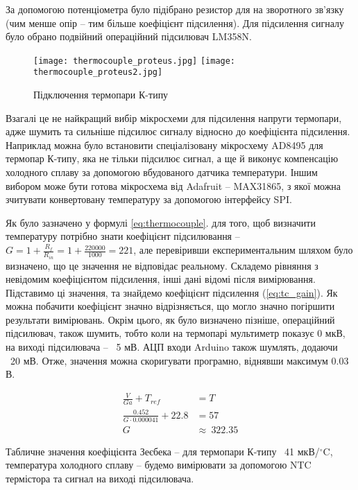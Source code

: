 За допомогою потенціометра було підібрано резистор для на зворотного зв'язку (чим менше опір -- тим більше коефіцієнт підсилення). Для підсилення сигналу було обрано подвійний операційний підсилювач LM358N.

\begin{figure}[ht]
    \centering
    \texttt{[image: thermocouple\_proteus.jpg]}
    \texttt{[image: thermocouple\_proteus2.jpg]}
    \caption{Підключення термопари К-типу}
    \label{fig:thermocouple_proteus}
\end{figure}

Взагалі це не найкращий вибір мікросхеми для підсилення напруги термопари, адже шумить та сильніше підсилює сигналу відносно до коефіцієнта підсилення. Наприклад можна було встановити спеціалізовану мікросхему AD8495 для термопар К-типу, яка не тільки підсилює сигнал, а ще й виконує компенсацію холодного сплаву за допомогою вбудованого датчика температури. Іншим вибором може бути готова мікросхема від Adafruit -- MAX31865, з якої можна зчитувати конвертовану температуру за допомогою інтерфейсу SPI.

Як було зазначено у формулі \ref{eq:thermocouple}. для того, щоб визначити температуру потрібно знати коефіцієнт підсилювання -- $G = 1+\frac{R_f}{R_{in}} = 1+\frac{220000}{1000} = 221$, але перевіривши експериментальним шляхом було визначено, що це значення не відповідає реальному. Складемо рівняння з невідомим коефіцієнтом підсилення, інші дані відомі після вимірювання. Підставимо ці значення, та знайдемо коефіцієнт підсилення (\ref{eq:tc_gain}). Як можна побачити коефіцієнт значно відрізняється, що могло значно погіршити результати вимірювань. Окрім цього, як було визначено пізніше, операційний підсилювач, також шумить, тобто коли на термопарі мультиметр показує 0 мкВ, на виході підсилювача -- ~5 мВ. АЦП входи Arduino також шумлять, додаючи ~20 мВ. Отже, значення можна скоригувати програмно, віднявши максимум 0.03 В.

\begin{equation}
    \begin{aligned}
        \frac{V}{Ga} + T_{ref} &= T \\
        \frac{0.452}{G\cdot0.000041} + 22.8 &= 57 \\
        G~&\approx~322.35
    \end{aligned}
    \label{eq:tc_gain}
\end{equation}

Табличне значення коефіцієнта Зеєбека -- для термопари К-типу ~41 мкВ/$^\circ$C, температура холодного сплаву -- будемо вимірювати за допомогою NTC термістора та сигнал на виході підсилювача.

